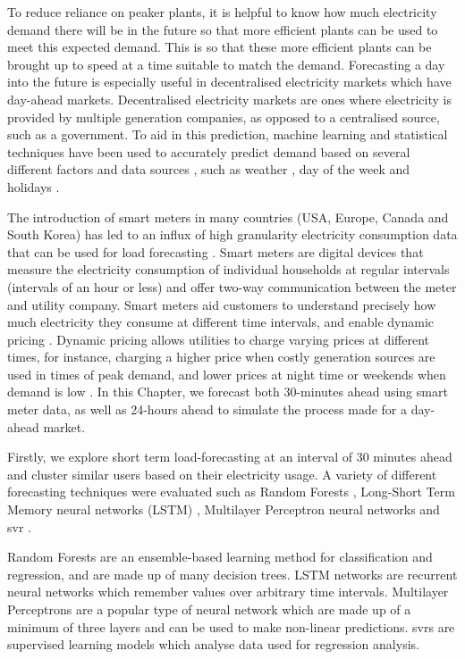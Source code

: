 To reduce reliance on peaker plants, it is helpful to know how much electricity demand there will be in the future so that more efficient plants can be used to meet this expected demand. This is so that these more efficient plants can be brought up to speed at a time suitable to match the demand. Forecasting a day into the future is especially useful in decentralised electricity markets which have day-ahead markets. Decentralised electricity markets are ones where electricity is provided by multiple generation companies, as opposed to a centralised source, such as a government. To aid in this prediction, machine learning and statistical techniques have been used to accurately predict demand based on several different factors and data sources \cite{Kell2018a}, such as weather \cite{Hong2014}, day of the week \cite{Al-Musaylh2018} and holidays \cite{Vrablecova2017}. 


The introduction of smart meters in many countries (USA, Europe, Canada and South Korea) has led to an influx of high granularity electricity consumption data that can be used for load forecasting \cite{Depuru2011a}. Smart meters are digital devices that measure the electricity consumption of individual households at regular intervals (intervals of an hour or less) and offer two-way communication between the meter and utility company. Smart meters aid customers to understand precisely how much electricity they consume at different time intervals, and enable dynamic pricing \cite{Abreu2012a}. Dynamic pricing allows utilities to charge varying prices at different times, for instance, charging a higher price when costly generation sources are used in times of peak demand, and lower prices at night time or weekends when demand is low \cite{Ito2013,Liu2016}. In this Chapter, we forecast both 30-minutes ahead using smart meter data, as well as 24-hours ahead to simulate the process made for a day-ahead market. 



Firstly, we explore short term load-forecasting at an interval of 30 minutes ahead and cluster similar users based on their electricity usage. A variety of different forecasting techniques were evaluated such as Random Forests \cite{ho1995random}, Long-Short Term Memory neural networks (LSTM) \cite{lstm}, Multilayer Perceptron neural networks \cite{book:984557} and \acrfull{svr} \cite{Drucker1997}.

Random Forests are an ensemble-based learning method for classification and regression, and are made up of many decision trees. LSTM networks are recurrent neural networks which remember values over arbitrary time intervals. Multilayer Perceptrons are a popular type of neural network which are made up of a minimum of three layers and can be used to make non-linear predictions. \acrshort{svr}s are supervised learning models which analyse data used for regression analysis.

